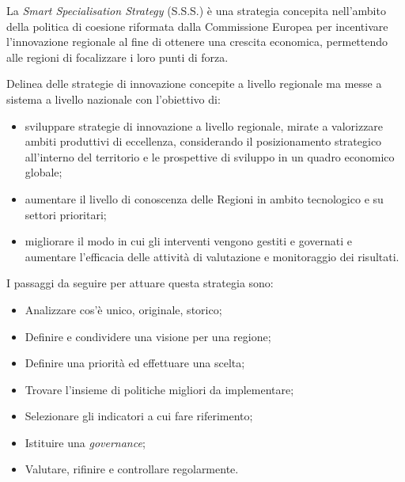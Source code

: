 \noindent La \textit{Smart Specialisation Strategy} (S.S.S.) è una strategia concepita nell'ambito della politica di coesione riformata dalla Commissione Europea per incentivare l'innovazione regionale al fine di ottenere una crescita economica, permettendo alle regioni di focalizzare i loro punti di forza.

Delinea delle strategie di innovazione concepite a livello regionale ma messe a sistema a livello nazionale con l'obiettivo di:
\begin{itemize}
\item sviluppare strategie di innovazione a livello regionale, mirate a valorizzare ambiti produttivi di eccellenza, considerando il posizionamento strategico all'interno del territorio e le prospettive di sviluppo in un quadro economico globale;
\item aumentare il livello di conoscenza delle Regioni in ambito tecnologico e su settori prioritari;
\item migliorare il modo in cui gli interventi vengono gestiti e governati e aumentare l'efficacia delle attività di valutazione e monitoraggio dei risultati.
\end{itemize}
I passaggi da seguire per attuare questa strategia sono:
\begin{itemize}
\item Analizzare cos'è unico, originale, storico;
\item Definire e condividere una visione per una regione;
\item Definire una priorità ed effettuare una scelta;
\item Trovare l'insieme di politiche migliori da implementare;
\item Selezionare gli indicatori a cui fare riferimento;
\item Istituire una \textit{governance};
\item Valutare, rifinire e controllare regolarmente.
\end{itemize}

